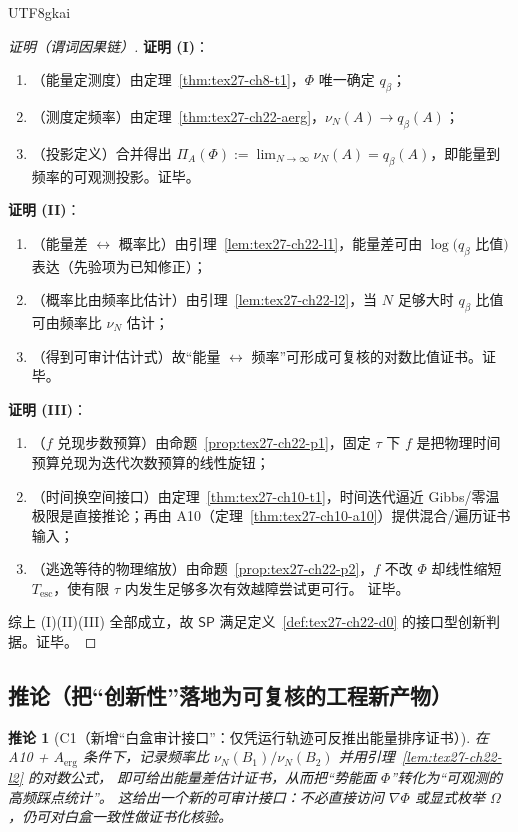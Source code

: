 \documentclass[12pt]{article}
\newtheorem{corollary}{推论}[section]
\begin{document}
\begin{CJK*}{UTF8}{gkai}
\begin{proof}[证明（谓词因果链）]
\textbf{证明 (I)}：
\begin{enumerate}
  \item（能量定测度）由定理~\ref{thm:tex27-ch8-t1}，$\Phi$ 唯一确定 $q_\beta$；
  \item（测度定频率）由定理~\ref{thm:tex27-ch22-aerg}，$\nu_N(A)\to q_\beta(A)$；
  \item（投影定义）合并得出 $\Pi_A(\Phi):=\lim_{N\to\infty}\nu_N(A)=q_\beta(A)$，即能量到频率的可观测投影。证毕。
\end{enumerate}

\textbf{证明 (II)}：
\begin{enumerate}
  \item（能量差 $\leftrightarrow$ 概率比）由引理~\ref{lem:tex27-ch22-l1}，能量差可由 $\log(q_\beta$ 比值$)$ 表达（先验项为已知修正）；
  \item（概率比由频率比估计）由引理~\ref{lem:tex27-ch22-l2}，当 $N$ 足够大时 $q_\beta$ 比值可由频率比 $\nu_N$ 估计；
  \item（得到可审计估计式）故“能量 $\leftrightarrow$ 频率”可形成可复核的对数比值证书。证毕。
\end{enumerate}

\textbf{证明 (III)}：
\begin{enumerate}
  \item（$f$ 兑现步数预算）由命题~\ref{prop:tex27-ch22-p1}，固定 $\tau$ 下 $f$ 是把物理时间预算兑现为迭代次数预算的线性旋钮；
  \item（时间换空间接口）由定理~\ref{thm:tex27-ch10-t1}，时间迭代逼近 Gibbs/零温极限是直接推论；再由 A10（定理~\ref{thm:tex27-ch10-a10}）提供混合/遍历证书输入；
  \item（逃逸等待的物理缩放）由命题~\ref{prop:tex27-ch22-p2}，$f$ 不改 $\Phi$ 却线性缩短 $T_{\mathrm{esc}}$，使有限 $\tau$ 内发生足够多次有效越障尝试更可行。
  证毕。
\end{enumerate}

综上 (I)(II)(III) 全部成立，故 $\mathsf{SP}$ 满足定义~\ref{def:tex27-ch22-d0} 的接口型创新判据。证毕。
\end{proof}

\subsection{推论（把“创新性”落地为可复核的工程新产物）}
\label{subsec:tex27-ch22-corollaries}

\begin{corollary}[C1（新增“白盒审计接口”：仅凭运行轨迹可反推出能量排序证书）]
\label{cor:tex27-ch22-c1}
在 A10 + $A_{\mathrm{erg}}$ 条件下，记录频率比 $\nu_N(B_1)/\nu_N(B_2)$ 并用引理~\ref{lem:tex27-ch22-l2} 的对数公式，
即可给出能量差估计证书，从而把“势能面 $\Phi$”转化为“可观测的高频踩点统计”。
这给出一个新的可审计接口：不必直接访问 $\nabla\Phi$ 或显式枚举 $\Omega$，仍可对白盒一致性做证书化核验。
\end{corollary}


\end{CJK*}
\end{document}
